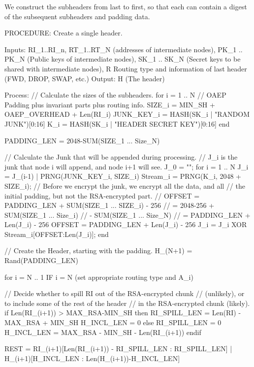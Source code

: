 We construct the subheaders from last to first, so that each can contain
a digest of the subsequent subheaders and padding data.

PROCEDURE: Create a single header.

Inputs: RI_1..RI_n, RT_1..RT_N (addresses of intermediate nodes), 
        PK_1 .. PK_N (Public keys of intermediate nodes),
        SK_1 .. SK_N (Secret keys to be shared with intermediate nodes),
        R Routing type and information of last header (FWD, DROP, SWAP, etc.)
Output: H (The header)

Process: 
  // Calculate the sizes of the subheaders.
  for i = 1 .. N
        // OAEP Padding plus invariant parts plus routing info.
        SIZE_i = MIN_SH + OAEP_OVERHEAD + Len(RI_i)
        JUNK_KEY_i = HASH(SK_i | "RANDOM JUNK")[0:16]
        K_i = HASH(SK_i | "HEADER SECRET KEY")[0:16]
  end

  PADDING_LEN = 2048-SUM(SIZE_1 ... Size_N)

  // Calculate the Junk that will be appended during processing.
  // J_i is the junk that node i will append, and node i+1 will see.
  J_0 = "";
  for i = 1 .. N
        J_i = J_(i-1) | PRNG(JUNK_KEY_i, SIZE_i)
        Stream_i = PRNG(K_i, 2048 + SIZE_i);
        // Before we encrypt the junk, we encrypt all the data, and all
        // the initial padding, but not the RSA-encrypted part.
        //    OFFSET = PADDING_LEN + SUM(SIZE_1 ... SIZE_i) - 256
        //           = 2048-256 + SUM(SIZE_1 ... Size_i)
        //                      - SUM(SIZE_1 ... Size_N)
        //           = PADDING_LEN + Len(J_i) - 256
        OFFSET = PADDING_LEN + Len(J_i) - 256
        J_i = J_i XOR Stream_i[OFFSET:Len(J_i)];
  end

  // Create the Header, starting with the padding.
  H_(N+1) = Rand(PADDING_LEN)

  for i = N .. 1
        IF i = N (set appropriate routing type and A_i)

        // Decide whether to spill RI out of the RSA-encrypted chunk
        // (unlikely), or to include some of the rest of the header
        // in the RSA-encrypted chunk (likely).
        if Len(RI_(i+1)) > MAX_RSA-MIN_SH then
             RI_SPILL_LEN = Len(RI) - MAX_RSA + MIN_SH
             H_INCL_LEN = 0
        else
             RI_SPILL_LEN = 0
             H_INCL_LEN = MAX_RSA - MIN_SH - Len(RI_(i+1))
        endif

        REST = RI_(i+1)[Len(RI_(i+1)) - RI_SPILL_LEN : RI_SPILL_LEN]
               | H_(i+1)[H_INCL_LEN : Len(H_(i+1))-H_INCL_LEN]

